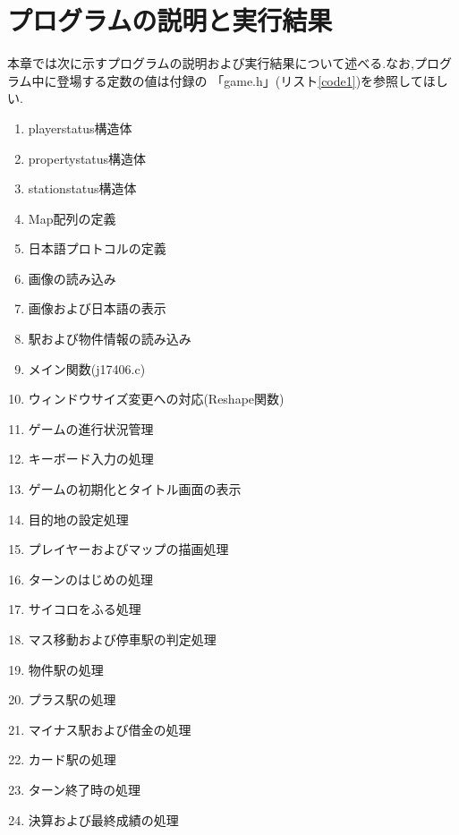 \documentclass[a4j]{jarticle}
\begin{document}
    \section{プログラムの説明と実行結果}
    本章では次に示すプログラムの説明および実行結果について述べる.なお,プログラム中に登場する定数の値は付録の
    「game.h」(リスト\ref{code1})を参照してほしい.
    \begin{enumerate}
        \item playerstatus構造体
        \item propertystatus構造体
        \item stationstatus構造体
        \item Map配列の定義
        \item 日本語プロトコルの定義
        \item 画像の読み込み
        \item 画像および日本語の表示
        \item 駅および物件情報の読み込み
        \item メイン関数(j17406.c)
        \item ウィンドウサイズ変更への対応(Reshape関数)
        \item ゲームの進行状況管理
        \item キーボード入力の処理
        \item ゲームの初期化とタイトル画面の表示
        \item 目的地の設定処理
        \item プレイヤーおよびマップの描画処理
        \item ターンのはじめの処理
        \item サイコロをふる処理
        \item マス移動および停車駅の判定処理
        \item 物件駅の処理
        \item プラス駅の処理
        \item マイナス駅および借金の処理
        \item カード駅の処理
        \item ターン終了時の処理
        \item 決算および最終成績の処理
    \end{enumerate}    
\end{document}
